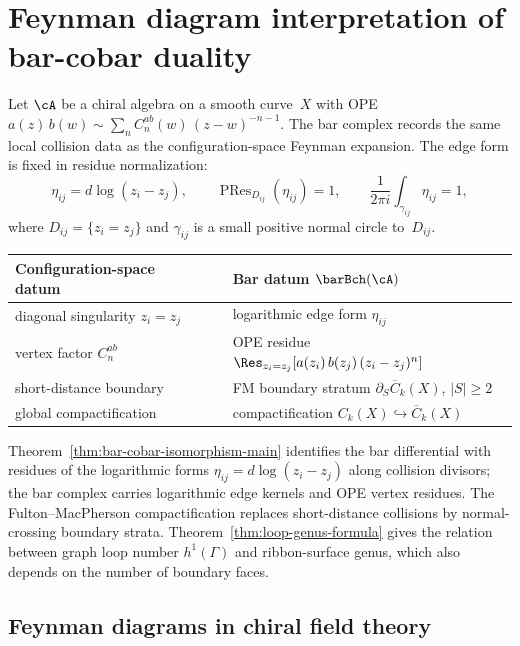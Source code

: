 \chapter{Feynman diagram interpretation of bar-cobar duality}
\label{ch:feynman}

\begin{remark}
\label{rem:feynman-bar-bridge}
Let $\cA$ be a chiral algebra on a smooth curve~$X$ with OPE
$a(z)\,b(w) \sim \sum_n C^{ab}_n(w)\,(z-w)^{-n-1}$.
The bar complex records the same local collision data as the
configuration-space Feynman expansion.  The edge form is fixed in
residue normalization:
\[
\eta_{ij}=d\log(z_i-z_j),\qquad
\operatorname{PRes}_{D_{ij}}(\eta_{ij})=1,\qquad
\frac{1}{2\pi i}\int_{\gamma_{ij}}\eta_{ij}=1,
\]
where $D_{ij}=\{z_i=z_j\}$ and $\gamma_{ij}$ is a small positive normal
circle to~$D_{ij}$.
\begin{center}
\renewcommand{\arraystretch}{1.25}
\begin{tabular}{lcl}
\textbf{Configuration-space datum} && \textbf{Bar datum $\barBch(\cA)$} \\
\hline
diagonal singularity $z_i=z_j$
 && logarithmic edge form $\eta_{ij}$ \\
vertex factor $C^{ab}_n$
 && OPE residue $\Res_{z_i = z_j}[a(z_i)\,b(z_j)\,(z_i-z_j)^n]$ \\
short-distance boundary
 && FM boundary stratum $\partial_S\overline{C}_k(X)$, $|S|\ge 2$ \\
global compactification
 && compactification $C_k(X) \hookrightarrow \overline{C}_k(X)$
\end{tabular}
\end{center}
Theorem~\ref{thm:bar-cobar-isomorphism-main}
identifies the bar differential with residues of the logarithmic forms
$\eta_{ij} = d\log(z_i-z_j)$ along collision divisors; the bar
complex carries logarithmic edge kernels and OPE vertex
residues. The Fulton--MacPherson compactification replaces
short-distance collisions by normal-crossing boundary strata.
Theorem~\ref{thm:loop-genus-formula} gives the relation between
graph loop number $h^1(\Gamma)$ and ribbon-surface genus, which
also depends on the number of boundary faces.
\end{remark}


\section{Feynman diagrams in chiral field theory}

